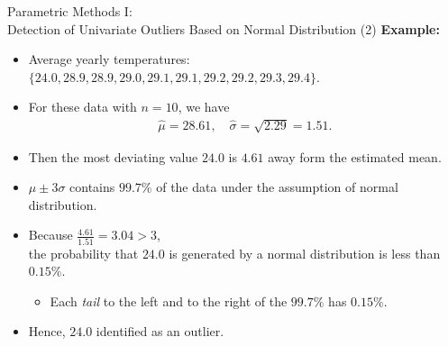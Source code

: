 \begin{frame}{Parametric Methods I: \\ Detection of Univariate Outliers Based on Normal Distribution (2)}
	\textbf{Example:}
	\begin{itemize}
		\item Average yearly temperatures: $\{24.0, 28.9, 28.9, 29.0, 29.1, 29.1, 29.2, 29.2, 29.3, 29.4\}$.
		\item For these data with $n = 10$, we have
		      \begin{align}
			      \widehat{\mu}=28.61, \quad \widehat{\sigma}=\sqrt{2.29}=1.51.
		      \end{align}
		\item Then the most deviating value $24.0$ is $4.61$ away form the estimated mean.
		\item $\mu \pm 3\sigma $ contains $99.7\%$ of the data under the assumption of normal distribution.
		\item Because $\frac{4.61}{1.51}  =  3.04  >  3$, \\
		      the probability that $24.0$ is generated by a normal distribution is less than $0.15\%$.
		      \begin{itemize}
			      \item Each \emph{tail} to the left and to the right of the $99.7\%$ has $0.15\%$.
		      \end{itemize}
		\item Hence, $24.0$ identified as an outlier.
	\end{itemize}
\end{frame}


